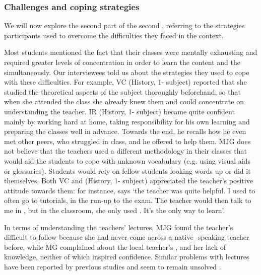\documentclass[output=paper]{langsci/langscibook}
\begin{document}
\subsubsection{Challenges and coping strategies} 

We will now explore the second part of the second , referring to the strategies participants used to overcome the difficulties they faced in the  context. 


  
Most students mentioned the fact that their  classes were mentally exhausting and required greater levels of concentration in order to learn the content and the  simultaneously. Our interviewees told us about the strategies they used to cope with these difficulties. For example, VC (History, 1- subject) reported that she studied the theoretical aspects of the subject thoroughly beforehand, so that when she attended the class she already knew them and could concentrate on understanding the teacher. IR (History, 1- subject) became quite confident mainly by working hard at home, taking responsibility for his own learning and preparing the classes well in advance. Towards the end, he recalls how he even met other peers, who struggled in class, and he offered to help them. MJG does not believe that the teachers used a different methodology in their  classes that would aid the students to cope with unknown vocabulary (e.g. using visual aids or glossaries). Students would rely on fellow students looking words up or did it themselves. Both VC and  (History, 1- subject) appreciated the teacher’s positive attitude towards them: for instance,  says ‘the teacher was quite helpful. I used to often go to tutorials, in the run-up to the exam. The teacher would then talk to me in , but in the classroom, she only used . It’s the only way to learn’.



In terms of understanding the teachers’ lectures, MJG found the teacher’s  difficult to follow because she had never come across a native -speaking teacher before, while MG complained about the local teacher’s , and her lack of  knowledge, neither of which inspired confidence. Similar problems with lectures have been reported by previous studies and seem to remain unsolved \citep{FlowerdewMiller1992, Hellekjaer2010}.
\end{document}
